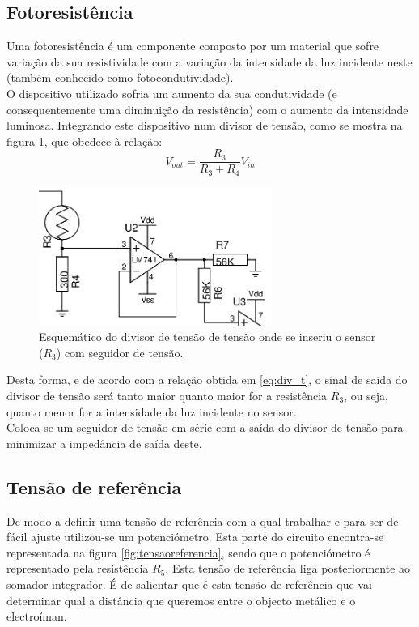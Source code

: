 \documentclass[%
  reprint,
  nofootinbib,
  amsmath,amssymb,
  aps,
  10pt,
  a4paper
]{revtex4-1}
\begin{document}
\subsection{Fotoresistência}
Uma fotoresistência é um componente composto por um material que sofre variação da sua resistividade com a variação da intensidade da luz incidente neste (também conhecido como fotocondutividade).\\
O dispositivo utilizado sofria um aumento da sua condutividade (e consequentemente uma diminuição da resistência) com o aumento da intensidade luminosa. Integrando este dispositivo num divisor de tensão, como se mostra na figura \ref{fig:foto_res}, que obedece à relação:
\begin{equation}
V_{out}=\frac{R_3}{R_3+R_4}V_{in}
\label{eq:div_t}
\end{equation}
\begin{figure}[h]
\includegraphics[width=3in]{../img/sensor.png}
\caption{Esquemático do divisor de tensão de tensão onde se inseriu o sensor ($R_3$) com seguidor de tensão.}
\label{fig:foto_res}
\end{figure}
Desta forma, e de acordo com a relação obtida em \ref{eq:div_t}, o sinal de saída do divisor de tensão será tanto maior quanto maior for a resistência $R_3$, ou seja, quanto menor for a intensidade da luz incidente no sensor.\\
Coloca-se um seguidor de tensão em série com a saída do divisor de tensão para minimizar a impedância de saída deste.


\subsection{Tensão de referência}
De modo a definir uma tensão de referência com a qual trabalhar e para ser de fácil ajuste utilizou-se um potenciómetro. Esta parte do circuito encontra-se representada na figura \ref{fig:tensaoreferencia}, sendo que o potenciómetro é representado pela resistência $R_5$. Esta tensão de referência liga posteriormente ao somador integrador. É de salientar que é esta tensão de referência que vai determinar qual a distância que queremos entre o objecto metálico e o electroíman.
\end{document}
